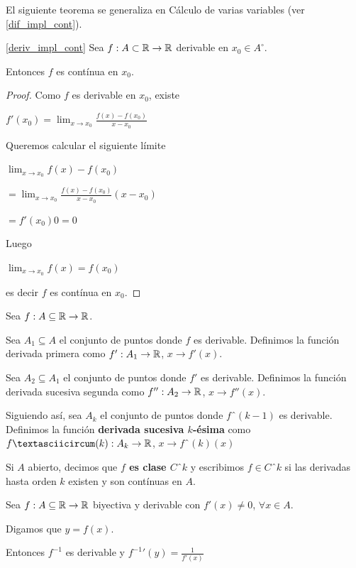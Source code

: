 
El siguiente teorema se generaliza en Cálculo de varias variables (ver \ref{dif_impl_cont}).

\begin{theorem} \ref{deriv_impl_cont}
Sea $ f : A \subset \mathbb{R} \to \mathbb{R}$ derivable en $ x_0 \in A^{\circ}$.

Entonces $f$ es contínua en $x_0$.
\end{theorem}

\begin{proof}
Como $f$ es derivable en $x_0$, existe

$f'(x_0) = \lim_{x \to x_0} \frac{f(x) - f(x_0)}{x - x_0}$

Queremos calcular el siguiente límite

$ \lim_{x \to x_0} f(x) - f(x_0)$

$ = \lim_{x \to x_0} \frac{f(x) - f(x_0)}{x - x_0} (x - x_0)$

$ = f'(x_0) 0 = 0$

Luego

$ \lim_{x \to x_0} f(x) = f(x_0)$

es decir $f$ es contínua en $x_0$.
\end{proof}

\begin{definition}[Sucesivas]
Sea $f:A \subseteq \mathbb{R} \to \mathbb{R}$.

Sea $A_1 \subseteq A$ el conjunto de puntos donde $f$ es derivable.  Definimos la función derivada primera como $f' : A_1 \to \mathbb{R}$, $x \to f'(x)$.

Sea $A_2 \subseteq A_1$ el conjunto de puntos donde $f'$ es derivable.  Definimos la función derivada sucesiva segunda como $f'' : A_2 \to \mathbb{R}$, $x \to f''(x)$.

Siguiendo así, sea $A_k$ el conjunto de puntos donde $fˆ{(k-1)}$ es derivable.  Definimos la función \textbf{derivada sucesiva $k$-ésima} como $fˆ{(k)} : A_k \to \RR$, $x \to fˆ{(k)}(x)$

Si $A$ abierto, decimos que \textbf{$f$ es clase $Cˆk$} y escribimos $f \in Cˆk$ si las derivadas hasta orden $k$ existen y son contínuas en $A$.
\end{definition}

\begin{theorem}[Inversa]
Sea $f : A \subseteq \mathbb{R} \to \mathbb{R}$ biyectiva y derivable con $f'(x) \neq 0$, $\forall x \in A$.

Digamos que $y = f(x)$.

Entonces $f^{-1}$ es derivable y $f^{-1}'(y) = \frac{1}{f'(x)}$

\end{theorem}

